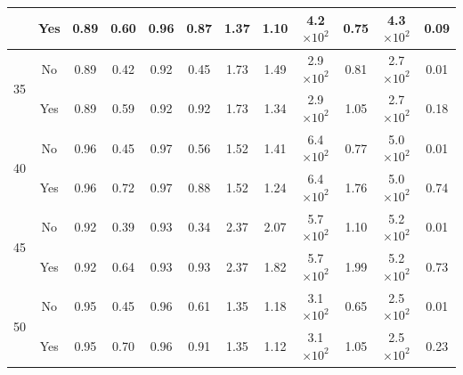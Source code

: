 \begin{tabular}{cccccccccccc}
 & Yes & 0.89 & 0.60 & 0.96 & 0.87 & 1.37 & 1.10 & 4.2 $\times 10^{2}$ & 0.75 & 4.3 $\times 10^{2}$ & 0.09 \\
\midrule
\multirow{2}{*}{35} & No & 0.89 & 0.42 & 0.92 & 0.45 & 1.73 & 1.49 & 2.9 $\times 10^{2}$ & 0.81 & 2.7 $\times 10^{2}$ & 0.01 \\
 & Yes & 0.89 & 0.59 & 0.92 & 0.92 & 1.73 & 1.34 & 2.9 $\times 10^{2}$ & 1.05 & 2.7 $\times 10^{2}$ & 0.18 \\
\midrule
\multirow{2}{*}{40} & No & 0.96 & 0.45 & 0.97 & 0.56 & 1.52 & 1.41 & 6.4 $\times 10^{2}$ & 0.77 & 5.0 $\times 10^{2}$ & 0.01 \\
 & Yes & 0.96 & 0.72 & 0.97 & 0.88 & 1.52 & 1.24 & 6.4 $\times 10^{2}$ & 1.76 & 5.0 $\times 10^{2}$ & 0.74 \\
\midrule
\multirow{2}{*}{45} & No & 0.92 & 0.39 & 0.93 & 0.34 & 2.37 & 2.07 & 5.7 $\times 10^{2}$ & 1.10 & 5.2 $\times 10^{2}$ & 0.01 \\
 & Yes & 0.92 & 0.64 & 0.93 & 0.93 & 2.37 & 1.82 & 5.7 $\times 10^{2}$ & 1.99 & 5.2 $\times 10^{2}$ & 0.73 \\
\midrule
\multirow{2}{*}{50} & No & 0.95 & 0.45 & 0.96 & 0.61 & 1.35 & 1.18 & 3.1 $\times 10^{2}$ & 0.65 & 2.5 $\times 10^{2}$ & 0.01 \\
 & Yes & 0.95 & 0.70 & 0.96 & 0.91 & 1.35 & 1.12 & 3.1 $\times 10^{2}$ & 1.05 & 2.5 $\times 10^{2}$ & 0.23 \\
\bottomrule
\end{tabular}
